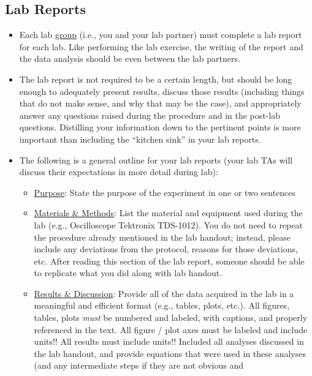 \subsection{Lab Reports}
\begin{itemize}
    \item Each lab \underline{group} (i.e., you and your lab partner) must
        complete a lab report for each lab.  Like performing the lab exercise,
        the writing of the report and the data analysis should be even between
        the lab partners.
    \item The lab report is not required to be a certain length, but should be
        long enough to adequately present results, discuss those results
        (including things that do not make sense, and why that may be the
        case), and appropriately answer any questions raised during the
        procedure and in the post-lab questions.  Distilling your information
        down to the pertinent points is more important than including the
        ``kitchen sink'' in your lab reports.
    \item The following is a general outline for your lab reports (your lab TAs
        will discuss their expectations in more detail during lab):
    \begin{itemize}
        \item \underline{Purpose}: State the purpose of the experiment in one
            or two sentences
        \item \underline{Materials \& Methods}: List the material and equipment
            used during the lab (e.g., Oscilloscope Tektronix TDS-1012).  You
            do not need to repeat the procedure already mentioned in the lab
            handout; instead, please include any deviations from the protocol,
            reasons for those deviations, etc.  After reading this section of
            the lab report, someone should be able to replicate what you did
            along with lab handout.
        \item \underline{Results \& Discussion}: Provide all of the data
            acquired in the lab in a meaningful and efficient format (e.g.,
            tables, plots, etc.).  All figures, tables, plots \emph{must} be
            numbered and labeled, with captions, and properly referenced in the
            text.  All figure / plot axes must be labeled and include units!!
            All results must include units!! Included all analyses discussed in
            the lab handout, and provide equations that were used in these
            analyses (and any intermediate steps if they are not obvious and

\end{itemize}
\end{itemize}
